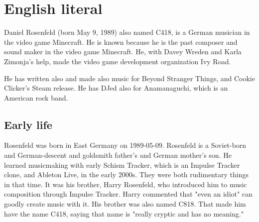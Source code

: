 \section{English literal}
Daniel Rosenfeld (born May 9, 1989) also named C418, is a German musician in the video game Minecraft.
He is known because he is the past composer and sound maker in the video game Minecraft.
He, with Davey Wreden and Karla Zimonja's help, made the video game development organization Ivy Road.

He has written also and made also music for Beyond Stranger Things, and Cookie Clicker's Steam release.
He has DJed also for Anamanaguchi, which is an American rock band.

\subsection{Early life}
Rosenfeld was born in East Germany on 1989-05-09.
Rosenfeld is a Soviet-born and German-descent and goldsmith father's and German mother's son.
He learned musicmaking with early Schism Tracker, which is an Impulse Tracker clone, and Ableton Live, in the early 2000s.
They were both rudimentary things in that time.
It was his brother, Harry Rosenfeld, who introduced him to music composition through Impulse Tracker.
Harry commented that "even an idiot" can goodly create music with it.
His brother was also named C818.
That made him have the name C418, saying that name is "really cryptic and has no meaning."
